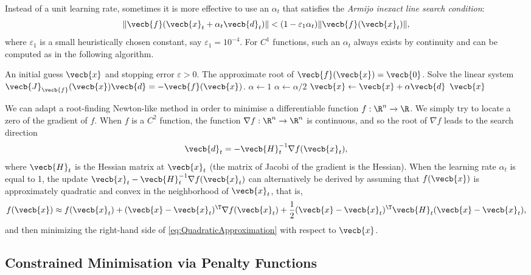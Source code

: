 Instead of a unit learning rate, sometimes it is more effective to use an $\alpha_t$ that satisfies the \textit{Armijo inexact line search condition}:
\begin{equation*}
	\|\vecb{f}(\vecb{x}_t + \alpha_t \vecb{d}_t)\| < (1 - \varepsilon_1 \alpha_t) \|\vecb{f}(\vecb{x}_t)\|,
\end{equation*}
where $\varepsilon_1$ is a small heuristically chosen constant, say $\varepsilon_1 = 10^{-4}$. For $C^1$ functions, such an $\alpha_t$ always exists by continuity and can be computed as in the following algorithm.

\begin{algorithm}[H]
	\caption{Newton--Raphson for Finding Roots of $\vecb{f}(\vecb{x}) = \vecb{0}$}
	\label{alg:NewtonRaphson}
	\begin{algorithmic}[1]
		\Require An initial guess $\vecb{x}$ and stopping error $\varepsilon > 0$.
		\Ensure The approximate root of $\vecb{f}(\vecb{x}) = \vecb{0}$.
		\State Solve the linear system $\vecb{J}_{\vecb{f}}(\vecb{x}) \vecb{d} = -\vecb{f}(\vecb{x})$.
		\State $\alpha \gets 1$
		\State $\alpha \gets \alpha/2$
		\EndWhile
		\State $\vecb{x} \gets \vecb{x} + \alpha \vecb{d}$
		\EndWhile
		\State \Return $\vecb{x}$
	\end{algorithmic}
\end{algorithm}

We can adapt a root-finding Newton-like method in order to minimise a differentiable function $f : \R^n \to \R$. We simply try to locate a zero of the gradient of $f$. When $f$ is a $C^2$ function, the function $\nabla f : \R^n \to \R^n$ is continuous, and so the root of $\nabla f$ leads to the search direction
\begin{equation}
	\vecb{d}_t = -\vecb{H}_t^{-1} \nabla f(\vecb{x}_t), \label{eq:NewtonSearchDirection}
\end{equation}
where $\vecb{H}_t$ is the Hessian matrix at $\vecb{x}_t$ (the matrix of Jacobi of the gradient is the Hessian). When the learning rate $\alpha_t$ is equal to 1, the update $\vecb{x}_t - \vecb{H}_t^{-1} \nabla f(\vecb{x}_t)$ can alternatively be derived by assuming that $f(\vecb{x})$ is approximately quadratic and convex in the neighborhood of $\vecb{x}_t$, that is,
\begin{equation}
	f(\vecb{x}) \approx f(\vecb{x}_t) + (\vecb{x} - \vecb{x}_t)^\T \nabla f(\vecb{x}_t) + \frac{1}{2} (\vecb{x} - \vecb{x}_t)^\T \vecb{H}_t (\vecb{x} - \vecb{x}_t), \label{eq:QuadraticApproximation}
\end{equation}
and then minimizing the right-hand side of \cref{eq:QuadraticApproximation} with respect to $\vecb{x}$.

\subsection{Constrained Minimisation via Penalty Functions}
